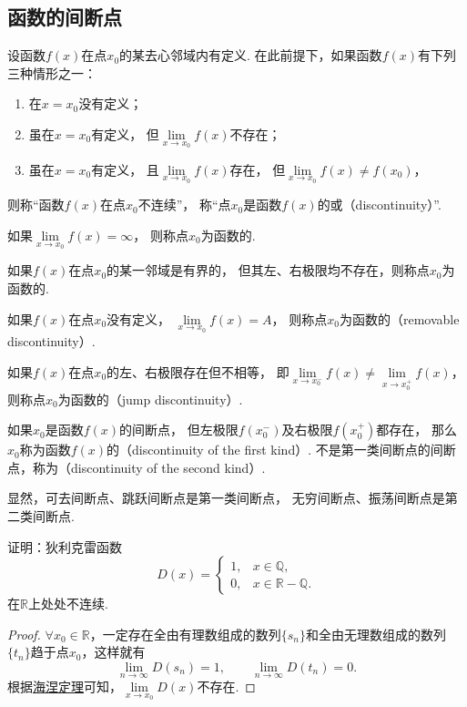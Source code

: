\subsection{函数的间断点}
设函数\(f(x)\)在点\(x_0\)的某去心邻域内有定义.
在此前提下，如果函数\(f(x)\)有下列三种情形之一：
\begin{enumerate}
	\item 在\(x=x_0\)没有定义；
	\item 虽在\(x=x_0\)有定义，
	但\(\lim\limits_{x \to x_0} f(x)\)不存在；
	\item 虽在\(x=x_0\)有定义，
	且\(\lim\limits_{x \to x_0} f(x)\)存在，
	但\(\lim\limits_{x \to x_0} f(x) \neq f(x_0)\)，
\end{enumerate}
则称“函数\(f(x)\)在点\(x_0\)不连续”，
称“点\(x_0\)是函数\(f(x)\)的或（discontinuity）”.

\begin{definition}
如果\(\lim\limits_{x \to x_0}f(x) = \infty\)，
则称点\(x_0\)为函数的.

如果\(f(x)\)在点\(x_0\)的某一邻域是有界的，
但其左、右极限均不存在，则称点\(x_0\)为函数的.

如果\(f(x)\)在点\(x_0\)没有定义，
\(\lim\limits_{x \to x_0}f(x) = A\)，
则称点\(x_0\)为函数的（removable discontinuity）.

如果\(f(x)\)在点\(x_0\)的左、右极限存在但不相等，
即\(\lim\limits_{x \to x_0^-}f(x) \neq \lim\limits_{x \to x_0^+}f(x)\)，
则称点\(x_0\)为函数的（jump discontinuity）.

如果\(x_0\)是函数\(f(x)\)的间断点，
但左极限\(f(x_0^-)\)及右极限\(f(x_0^+)\)都存在，
那么\(x_0\)称为函数\(f(x)\)的（discontinuity of the first kind）.
不是第一类间断点的间断点，称为（discontinuity of the second kind）.
\end{definition}
显然，可去间断点、跳跃间断点是第一类间断点，
无穷间断点、振荡间断点是第二类间断点.

\begin{example}\label{example:极限.狄利克雷函数在实数域上处处不连续}
证明：狄利克雷函数\[
D(x) = \left\{ \begin{array}{ll}
1, & x \in \mathbb{Q}, \\
0, & x \in \mathbb{R} - \mathbb{Q}.
\end{array} \right.
\]在\(\mathbb{R}\)上处处不连续.
\begin{proof}
\(\forall x_0 \in \mathbb{R}\)，一定存在全由有理数组成的数列\(\{s_n\}\)和全由无理数组成的数列\(\{t_n\}\)趋于点\(x_0\)，这样就有\[
\lim\limits_{n\to\infty} D(s_n) = 1,
\qquad
\lim\limits_{n\to\infty} D(t_n) = 0.
\]
根据\hyperref[theorem:极限.海涅定理]{海涅定理}可知，\(\lim\limits_{x \to x_0} D(x)\)不存在.
\end{proof}
\end{example}

